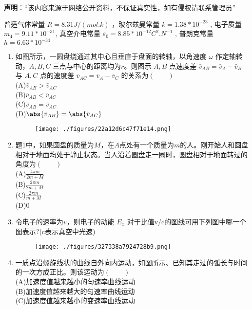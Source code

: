 
\textbf{声明}：“该内容来源于网络公开资料，不保证真实性，如有侵权请联系管理员”


普适气体常量  $R=8.31 J/(mol.k)$ ，玻尔兹曼常量 $k=1.38*10^{-23}$  , 电子质量  $m_4=9.11*10^{-31}$, 真空介电常量 $\varepsilon_0=8.85*10^{-12}C^2.N^{-1}$ , 普朗克常量 $h=6.63*10^{-34}$
\begin{enumerate}
\item 如图所示，一圆盘绕通过其中心且垂直于盘面的转轴，以角速度 $\omega$ 作定轴转动，$A,B,C$  三点与中心的距离均为$r$。则图示 $A,B$  点速度差 $\bar v_{AB}=\bar v_A-\bar v_B$ 与 $A,C$ 点的速度差 $\bar v_{AC}=\bar v_A-\bar v_C$  的关系为$(\qquad)$\\
(A)$\bar v_{AB}>\bar v_{AC}$\\
(B)$\bar v_{AB}<\bar v_{AC}$\\
(C)$\bar v_{AB}=\bar v_{AC}$\\
(D)$\abs{\bar v_{AB}}=\abs{\bar v_{AC}}$
\begin{figure}[ht]
\centering
\texttt{[image: ./figures/22a12d6c47f71e14.png]}
\caption{} \label{fig_HSD15_1}
\end{figure}
\item 题1中，如果圆盘的质量为$M$，在$A$点处有一个质量为$m$的人。刚开始人和圆盘相对于地面均处于静止状态。当人沿着圆盘走一圈时，圆盘相对于地面转过的角度为$(\qquad)$\\
(A)$\displaystyle \frac{4\pi m}{2m+M}$\\
(B)$\displaystyle \frac{2\pi m}{2m+M}$\\
(C)$\displaystyle \frac{2\pi m}{m+M}$\\
(D)$0$
\item 令电子的速率为$v$，则电子的动能 $E_x$ 对于比值v/c的图线可用下列图中哪一个图表示?(c表示真空中光速)\\
\begin{figure}[ht]
\centering
\texttt{[image: ./figures/327338a7924728b9.png]}
\caption{} \label{fig_HSD15_2}
\end{figure}
\item 一质点沿螺旋线状的曲线自外向内运动，如图所示、已知其走过的弧长与时间的一次方成正比。则该运动为$(\qquad)$\\
(A)加速度值越来越小的匀速率曲线运动\\
(B)加速度值越来越大的匀速率曲线运动\\
(C)加速度值越来越小的变速率曲线运动\\

\end{enumerate}
